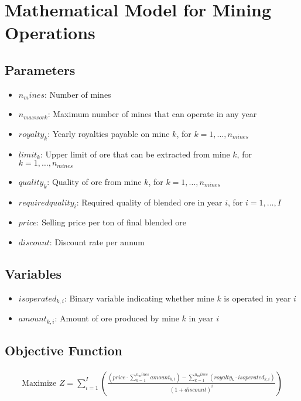\documentclass{article}
\begin{document}
\section*{Mathematical Model for Mining Operations}

\subsection*{Parameters}
\begin{itemize}
    \item $n_mines$: Number of mines
    \item $n_{maxwork}$: Maximum number of mines that can operate in any year
    \item $royalty_k$: Yearly royalties payable on mine $k$, for $k = 1, \ldots, n_{mines}$
    \item $limit_k$: Upper limit of ore that can be extracted from mine $k$, for $k = 1, \ldots, n_{mines}$
    \item $quality_k$: Quality of ore from mine $k$, for $k = 1, \ldots, n_{mines}$
    \item $requiredquality_i$: Required quality of blended ore in year $i$, for $i = 1, \ldots, I$
    \item $price$: Selling price per ton of final blended ore
    \item $discount$: Discount rate per annum
\end{itemize}

\subsection*{Variables}
\begin{itemize}
    \item $isoperated_{k,i}$: Binary variable indicating whether mine $k$ is operated in year $i$
    \item $amount_{k,i}$: Amount of ore produced by mine $k$ in year $i$
\end{itemize}

\subsection*{Objective Function}
\begin{align*}
\text{Maximize } Z = \sum_{i=1}^{I} \left( \frac{(price \cdot \sum_{k=1}^{n_mines} amount_{k,i}) - \sum_{k=1}^{n_mines} (royalty_k \cdot isoperated_{k,i})}{(1 + discount)^i} \right)
\end{align*}
\end{document}
